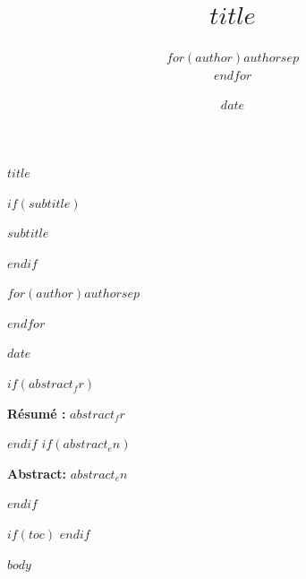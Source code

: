 \documentclass[11pt]{article}
\title{$title$}
\author{$for(author)$$author$$sep$ \\ $endfor$}
\date{$date$}
\renewcommand{\maketitle}{
  \begin{center}
  \vspace*{1cm}
  
  \begin{minipage}{\textwidth}
  \centering
  \fontsize{20}{26}\selectfont\textbf{$title$}
  \end{minipage}
  
  \vspace{0.4cm}
  
  $if(subtitle)$
  \begin{minipage}{\textwidth}
  \centering
  \fontsize{13}{16}\selectfont\itshape $subtitle$
  \end{minipage}
  $endif$
  
  \vspace{0.6cm}
  
  \begin{minipage}{\textwidth}
  \centering
  \Large
  $for(author)$$author$$sep$ \par $endfor$
  \end{minipage}
  
  \vspace{0.6cm}
  
  \Large $date$
  
  \end{center}
  \vspace{1cm}
}
\begin{document}
\maketitle
\thispagestyle{firstpage}

$if(abstract_fr)$
\begin{center}
\begin{minipage}{0.85\textwidth}
\noindent \textbf{Résumé :} $abstract_fr$
\end{minipage}
\end{center}
\vspace{0.5cm}
$endif$
$if(abstract_en)$
\begin{center}
\begin{minipage}{0.85\textwidth}
\noindent \textbf{Abstract:} $abstract_en$
\end{minipage}
\end{center}
\vspace{1cm}
$endif$


$if(toc)$
\tableofcontents
\clearpage        %
$endif$

\clearpage
\pagestyle{fancy}

$body$
\end{document}

